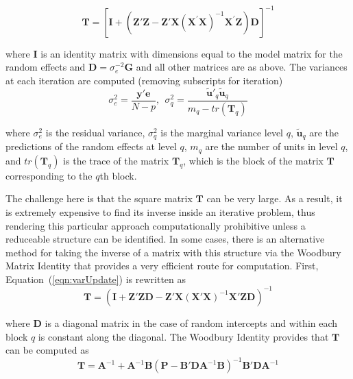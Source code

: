 \documentclass[12pt]{article}
\begin{document}
\begin{equation}
	\label{eqn:varUpdate}
	\bm{T} = \left[\bm{I} + \left(\bm{Z}'\bm{Z} - \bm{Z}'\bm{X} (\bm{X}^{'}\bm{X})^{-1} \bm{X}^{'}\bm{Z}\right)\bm{D}\right]^{-1}
\end{equation}

\noindent where $\bm{I}$ is an identity matrix with dimensions equal to the model matrix for the random effects and $\bm{D} = \sigma_{e}^{-2}\bm{G}$ and all other matrices are as above. The variances at each iteration are computed (removing subscripts for iteration)
\begin{equation}
	\label{eqn:vars:mixed}
	\sigma_{e}^2 = \frac{\bm{y}'\bm{e}}{N-p}, \ \ \sigma^2_{q} = \frac{\widetilde{\bm{u}}'_{q}\widetilde{\bm{u}}_{q}} {m_q - tr(\bm{T}_q)} 
\end{equation}

\noindent where $\sigma_{e}^2$ is the residual variance, $\sigma^2_{q}$ is the marginal variance level $q$, $\widetilde{\bm{u}}_q$ are the predictions of the random effects at level $q$, $m_q$ are the number of units in level $q$, and $tr(\bm{T}_q)$ is the trace of the matrix $\bm{T}_q$, which is the block of the matrix $\bm{T}$ corresponding to the $q$th block. 

The challenge here is that the square matrix $\bm{T}$ can be very large. As a result, it is extremely expensive to find its inverse inside an iterative problem, thus rendering this particular approach computationally prohibitive unless a reduceable structure can be identified. In some cases, there is an alternative method for taking the inverse of a matrix with this structure via the Woodbury Matrix Identity \cite{Woodbury1950} that provides a very efficient route for computation. First, Equation~(\ref{eqn:varUpdate}) is rewritten as
\begin{equation}
	\label{eqn:varStep1}
	\bm{T} = \left(\bm{I} +  \bm{Z}'\bm{Z}\bm{D} - \bm{Z}'\bm{X} (\bm{X}'\bm{X})^{-1} \bm{X}'\bm{Z}\bm{D}\right)^{-1}
\end{equation}

\noindent where $\bm{D}$ is a diagonal matrix in the case of random intercepts and within each block $q$ is constant along the diagonal. The Woodbury Identity provides that $\bm{T}$ can be computed as
\begin{equation}
	\label{eqn:woodbury}
	\bm{T} = \bm{A}^{-1} + \bm{A}^{-1}\bm{B}\left(\bm{P} - \bm{B}'\bm{D}\bm{A}^{-1}\bm{B}\right)^{-1}\bm{B}'\bm{D}\bm{A}^{-1}
\end{equation}
\end{document}
